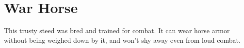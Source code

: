 \section{War Horse}

This trusty steed was bred and trained for combat. It can wear horse armor without being weighed down by it, and won't shy away even from loud combat.